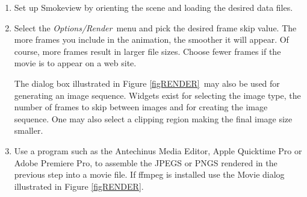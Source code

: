 \documentclass[11pt,twoside]{book}
\begin{document}
\begin{enumerate}
\item Set up Smokeview by orienting the scene and loading the
desired data files.

\item Select the {\em Options/Render}\ menu and pick the
desired frame skip value. The more frames you include in
the animation, the smoother it will appear. Of course, more
frames result in larger file sizes.  Choose fewer frames
if the movie is to appear on a web site.

The dialog box illustrated
in Figure \ref{figRENDER}\ may also be used for generating an image
sequence.  Widgets exist for selecting the image type, the number of
frames to skip between images and for creating the image sequence.
One may also select a clipping region making the final image size smaller.

\item Use a program such as the Antechinus Media Editor,
Apple Quicktime Pro
 or
Adobe Premiere Pro,
to assemble the
JPEGS or PNGS rendered in the previous step into a movie
file. If ffmpeg is installed use the Movie dialog illustrated in Figure \ref{figRENDER}.

\end{enumerate}
\end{document}
